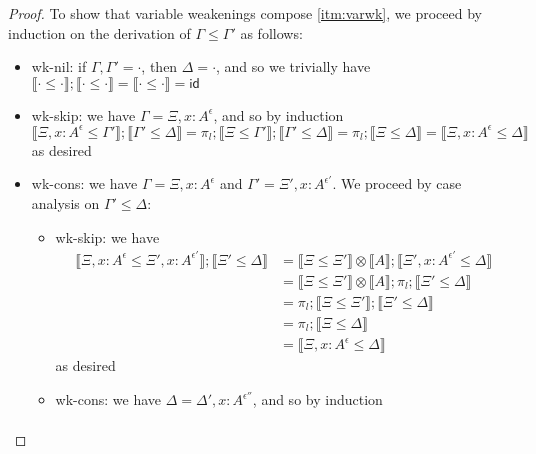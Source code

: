 \documentclass[acmsmall,screen,review]{acmart}
\newcommand{\ms}[1]{\ensuremath{\mathsf{#1}}}
\newcommand{\thyp}[3]{#1 : {#2}^{#3}}
\newcommand{\brle}[1]{{\textsf{#1}}}
\newcommand{\dnt}[1]{\llbracket{#1}\rrbracket}
\begin{document}
\weakeninglem*

\label{proof:weakening}

\begin{proof}
  To show that variable weakenings compose \ref{itm:varwk}, we proceed by induction on the
  derivation of $\Gamma \leq \Gamma'$ as follows:
  \begin{itemize}
    \item \brle{wk-nil}: if $\Gamma, \Gamma' = \cdot$, then $\Delta = \cdot$, and so we trivially
    have $\dnt{\cdot \leq \cdot} ; \dnt{\cdot \leq \cdot} = \dnt{\cdot \leq \cdot} = \ms{id}$
    \item \brle{wk-skip}: we have $\Gamma = \Xi, \thyp{x}{A}{\epsilon}$, and so by induction
    \begin{equation}
      \dnt{\Xi, \thyp{x}{A}{\epsilon} \leq \Gamma'} ; \dnt{\Gamma' \leq \Delta}
      = \pi_l ; \dnt{\Xi \leq \Gamma'} ; \dnt{\Gamma' \leq \Delta}
      = \pi_l ; \dnt{\Xi \leq \Delta}
      = \dnt{\Xi, \thyp{x}{A}{\epsilon} \leq \Delta}
    \end{equation}
    as desired
    \item \brle{wk-cons}: we have $\Gamma = \Xi, \thyp{x}{A}{\epsilon}$ and $\Gamma' = \Xi',
    \thyp{x}{A}{\epsilon'}$. We proceed by case analysis on $\Gamma' \leq \Delta$:
    \begin{itemize}
      \item \brle{wk-skip}: we have
      \begin{equation}
        \begin{aligned}
        \dnt{\Xi, \thyp{x}{A}{\epsilon} \leq \Xi', \thyp{x}{A}{\epsilon'}} ; \dnt{\Xi' \leq \Delta}
        & = \dnt{\Xi \leq \Xi'} \otimes \dnt{A} ; \dnt{\Xi', \thyp{x}{A}{\epsilon'} \leq \Delta} \\
        & = \dnt{\Xi \leq \Xi'} \otimes \dnt{A} ; \pi_l ; \dnt{\Xi' \leq \Delta} \\
        & = \pi_l ; \dnt{\Xi \leq \Xi'} ; \dnt{\Xi' \leq \Delta} \\
        & = \pi_l ; \dnt{\Xi \leq \Delta} \\
        & = \dnt{\Xi, \thyp{x}{A}{\epsilon} \leq \Delta}
        \end{aligned}
      \end{equation}
      as desired
      \item \brle{wk-cons}: we have $\Delta = \Delta' , \thyp{x}{A}{\epsilon''}$, and so by
      induction
      \begin{equation}
        \begin{aligned}

\end{aligned}
\end{equation}
\end{itemize}
\end{itemize}
\end{proof}
\end{document}
